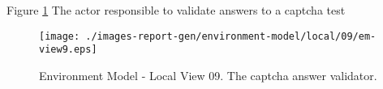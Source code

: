 
Figure \ref{fig:lu.uni.lassy.excalibur.examples.icrash-EM-view-local-09} The actor responsible to validate answers to a captcha test


\begin{figure}[htbp] 
\label{fig:lu.uni.lassy.excalibur.examples.icrash-EM}
\begin{center}
\texttt{[image: ./images-report-gen/environment-model/local/09/em-view9.eps]}
\end{center}
\caption[Environment Model - Local View 09 - The captcha answer validator]{Environment Model - Local View 09. The captcha answer validator.}
\label{fig:lu.uni.lassy.excalibur.examples.icrash-EM-view-local-09}
\end{figure}
\vspace{0.5cm} 
